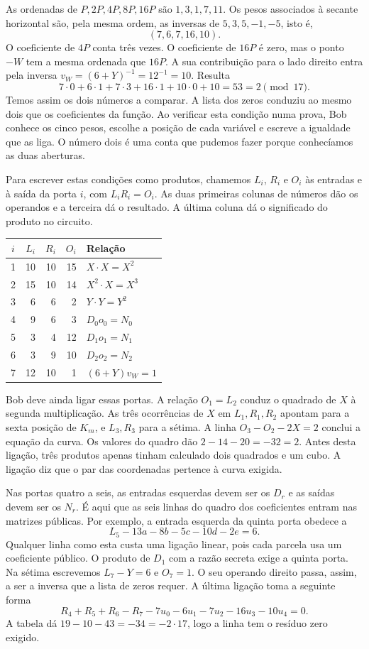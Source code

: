 As ordenadas de \(P,2P,4P,8P,16P\) são \(1,3,1,7,11\).
Os pesos associados à secante horizontal são, pela mesma ordem,
as inversas de \(5,3,5,-1,-5\), isto é,
\[
                         (7,6,7,16,10).
\]
O coeficiente de \(4P\) conta três vezes. O coeficiente de
\(16P\) é zero, mas o ponto \(-W\) tem a mesma ordenada que
\(16P\). A sua contribuição para o lado direito entra pela inversa
\(v_W=(6+Y)^{-1}=12^{-1}=10\). Resulta
\[
       7\cdot0+6\cdot1+7\cdot3+16\cdot1+10\cdot0+10
                       =53=2\pmod{17}.
\]
Temos assim os dois números a comparar. A lista dos zeros conduziu
ao mesmo dois que os coeficientes da função. Ao verificar esta
condição numa prova, Bob conhece os cinco pesos, escolhe a posição
de cada variável e escreve a igualdade que as liga. O número dois
é uma conta que pudemos fazer porque conhecíamos as duas aberturas.

Para escrever estas condições como produtos, chamemos \(L_i\),
\(R_i\) e \(O_i\) às entradas e à saída da porta \(i\), com
\(L_iR_i=O_i\). As duas primeiras colunas de números dão os operandos
e a terceira dá o resultado. A última coluna dá
o significado do produto no circuito.
\begin{center}
\begin{tabular}{c|rrr|l}
 \(i\)&\(L_i\)&\(R_i\)&\(O_i\)&Relação\\ \hline
 1&10&10&15&\(X\cdot X=X^2\)\\
 2&15&10&14&\(X^2\cdot X=X^3\)\\
 3& 6& 6& 2&\(Y\cdot Y=Y^2\)\\
 4& 9& 6& 3&\(D_0 o_0=N_0\)\\
 5& 3& 4&12&\(D_1 o_1=N_1\)\\
 6& 3& 9&10&\(D_2 o_2=N_2\)\\
 7&12&10& 1&\((6+Y)v_W=1\)
\end{tabular}
\end{center}
Bob deve ainda ligar essas portas. A relação \(O_1=L_2\) conduz
o quadrado de \(X\) à segunda multiplicação. As três ocorrências
de \(X\) em \(L_1,R_1,R_2\) apontam para a sexta posição de
\(K_m\), e \(L_3,R_3\) para a sétima. A linha
\(O_3-O_2-2X=2\) conclui a equação da curva. Os valores do
quadro dão \(2-14-20=-32=2\). Antes desta ligação, três produtos
apenas tinham calculado dois quadrados e um cubo. A ligação diz
que o par das coordenadas pertence à curva exigida.

Nas portas quatro a seis, as entradas esquerdas devem ser os
\(D_r\) e as saídas devem ser os \(N_r\). É aqui que as seis
linhas do quadro dos coeficientes entram nas matrizes públicas.
Por exemplo, a entrada esquerda da quinta porta obedece a
\[
      L_5-13a-8b-5c-10d-2e=6.
\]
Qualquer linha como esta custa uma ligação linear, pois cada parcela
usa um coeficiente público. O produto de \(D_1\) com a razão
secreta exige a quinta porta. Na sétima escrevemos
\(L_7-Y=6\) e \(O_7=1\). O seu operando direito passa, assim,
a ser a inversa que a lista de zeros requer. A última ligação toma
a seguinte forma
\[
  R_4+R_5+R_6-R_7-7u_0-6u_1-7u_2-16u_3-10u_4=0 .
\]
A tabela dá \(19-10-43=-34=-2\cdot17\), logo a linha tem o resíduo zero exigido.

